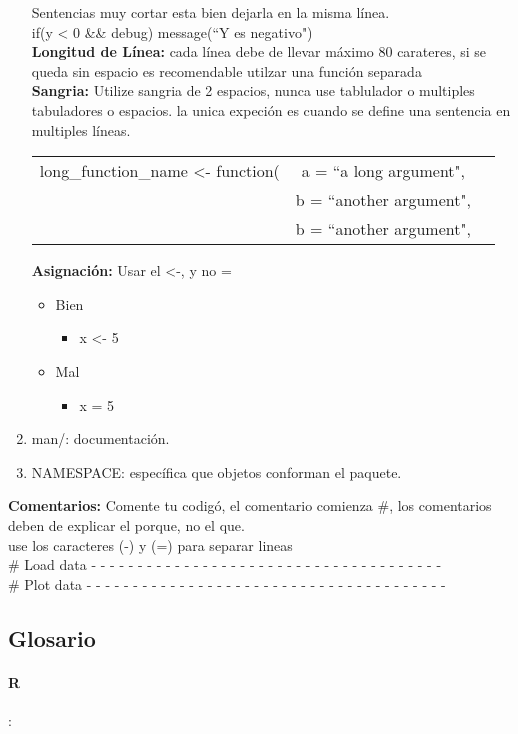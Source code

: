 \begin{enumerate}
Sentencias  muy cortar esta bien dejarla en la misma l\'inea.\\
if(y \textless \hspace{1mm} 0 \&\& debug) message(``Y es negativo")\\

\textbf{Longitud de L\'inea:} cada l\'inea debe de llevar m\'aximo 80 carateres, si se queda sin espacio es recomendable utilzar una funci\'on separada\\

\textbf{Sangria:} Utilize sangria de 2 espacios, nunca use tablulador o multiples tabuladores o espacios. la unica expeci\'on es cuando se define una sentencia en multiples l\'ineas.\\
\begin{tabular}{ccc}
long\_function\_name \textless- function(& a = ``a long argument", \\ 
 &  b = ``another argument", \\
 &  b = ``another argument", \\
\end{tabular}
\newline

\textbf{Asignaci\'on:} Usar el \textless-, y no =
\begin{itemize}
\item Bien  
\begin{itemize}
     \item x \textless- 5
  \end{itemize}
\item Mal
   \begin{itemize}
      \item x = 5
   \end{itemize}
 \end{itemize}

  \item man/: documentación.\\
  \item NAMESPACE: específica que objetos conforman el paquete.\\
\end{enumerate}
\textbf{Comentarios:} Comente tu codig\'o, el comentario comienza \#, los comentarios deben de explicar el porque, no el que.\\ use los caracteres (-) y (=) para separar lineas\\
{\# Load data - - - - - - - - - - - - - - - - - - - - - - - - - - - - - - - - - - - - - -}\\
{\# Plot data - - - - - - - - - - - - - - - - - - - - - - - - - - - - - - - - - - - - - - -}\\



 
\subsection{Glosario}

\paragraph{R}: 


